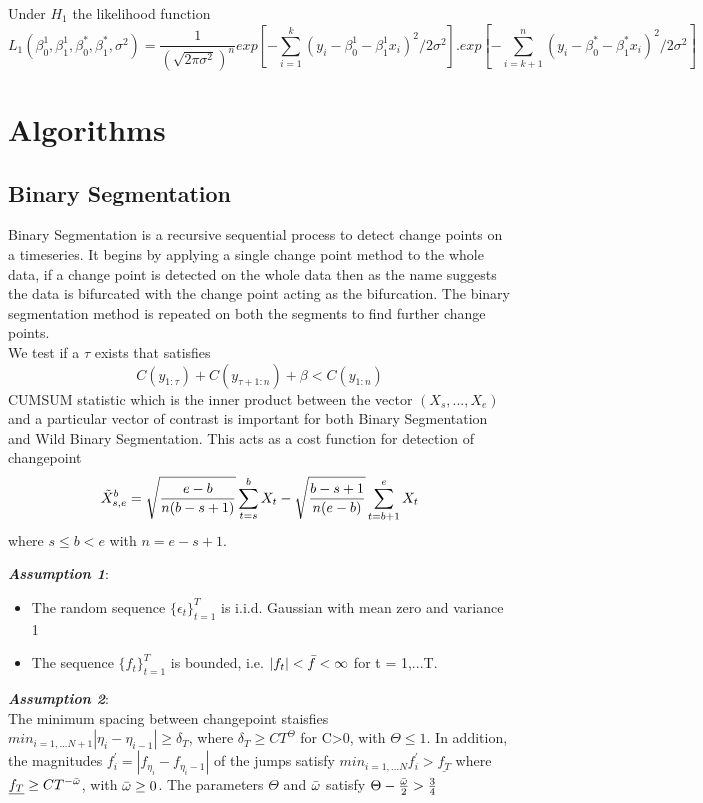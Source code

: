 \documentclass{article}
\begin{document}
Under $H_{1}$ the likelihood function\\
\begin{equation*}
    L_{1}(\beta_{0}^{1},\beta_{1}^{1},\beta_{0}^{*},\beta_{1}^{*},\sigma^{2}) = \frac{1}{(\sqrt{2\pi\sigma^{2}})^{n}} exp[-\sum_{i=1}^{k} (y_{i}- \beta_{0}^{1} -\beta_{1}^{1}x_{i})^{2}/2\sigma^{2} ]. exp[-\sum_{i=k+1}^{n}(y_{i}- \beta_{0}^{*} -\beta_{1}^{*}x_{i})^{2}/2\sigma^{2} ] 
\end{equation*}
\clearpage

\section{Algorithms}
\subsection{Binary Segmentation}
Binary Segmentation is a recursive sequential process to detect change points on a timeseries. It begins by applying a single change point method to the whole data, if a change point is detected on the whole data then as the name suggests the data is bifurcated with the change point acting as the bifurcation. The binary segmentation method is repeated on both the segments to find further change points. \\
We test if a $\tau$ exists that satisfies
$$C(y_{1:\tau}) + C(y_{\tau + 1: n}) + \beta < C(y_{1:n})$$
CUMSUM statistic which is the inner product between the vector $(X_{s},...,X_{e})$ and a particular vector of contrast is important for both Binary Segmentation and Wild Binary Segmentation. This acts as a cost function for detection of changepoint
$$\Tilde{X}^{b}_{s,e} = \sqrt{\frac{e-b}{n(b-s+1)}} \sum_{t=s}^{b} X_{t} - \sqrt{\frac{b-s+1}{n(e-b)}}\sum_{t=b+1}^{e}X_{t}$$ where $s \leq b < e $ with $n = e - s + 1$. 

\textbf{\textit{Assumption 1}}: 
\begin{itemize}
    \item The random sequence $\{\epsilon_{t}\}^{T}_{t=1}$ is i.i.d. Gaussian with mean zero and variance 1
    \item The sequence $\{f_{t}\}^{T}_{t=1}$ is bounded, i.e. $|f_{t}|<\Bar{f} < \infty$ for t = 1,...T.
\end{itemize}
\textbf{\textit{Assumption 2}}:\\
The minimum spacing between changepoint staisfies $min_{i=1,...N+1} |\eta_{i} - \eta_{i-1}|\geq \delta_{T}$, where $\delta_{T} \geq CT^{\Theta}$ for C>0, with $\Theta\leq 1$. In addition, the magnitudes $f^{'}_{i} = |f_{\eta_{i}}-f_{\eta_{i}-1}|$ of the jumps satisfy $min_{i=1,...N} f^{'}_{i} > \underline{f_{T}}$ where $\underline{f_{T}} \geq CT^{-\Bar{\omega}}$, with $\Bar{\omega}\geq 0$. The parameters $\Theta$ and $\Bar{\omega}$ satisfy $\Theta - \frac{\Bar{\omega}}{2}>\frac{3}{4}$
\end{document}
